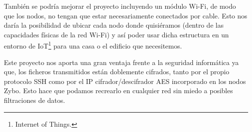 También se podría mejorar el proyecto incluyendo un módulo Wi-Fi, de modo que los nodos, no tengan que estar necesariamente conectados por cable. Esto nos daría la posibilidad de ubicar cada nodo donde quisiéramos (dentro de las capacidades físicas de la red Wi-Fi) y así poder usar dicha estructura en un entorno de IoT\footnote{Internet of Things.} para una casa o el edificio que necesitemos.

Este proyecto nos aporta una gran ventaja frente a la seguridad informática ya que, los ficheros transmitidos están doblemente cifrados, tanto por el propio protocolo SSH como por el IP cifrador/descifrador AES incorporado en los nodos Zybo. Esto hace que podamos recrearlo en cualquier red sin miedo a posibles filtraciones de datos.